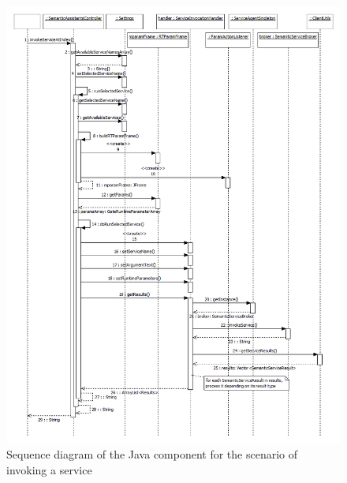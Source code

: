 \begin{figure}[htb]
  \centering
  \includegraphics[totalheight=0.8\textheight]{pictures/mozilla_development_notes_java_component_sequence_diagram_invoke_service.png}
  \caption{Sequence diagram of the Java component for the scenario of invoking a service}
  \label{fig:mozilla_development_notes_java_component_sequence_diagram_invoke_service}
\end{figure}
